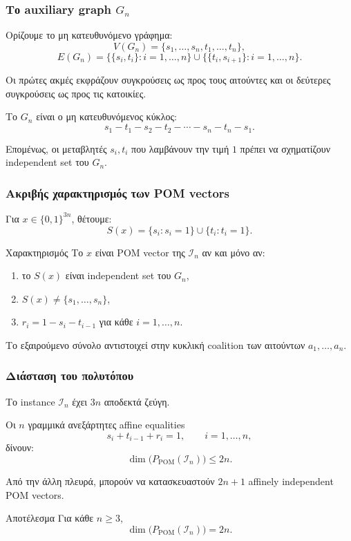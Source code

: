 \documentclass{beamer}
\begin{document}
	\begin{frame}
		\frametitle{Το auxiliary graph $G_n$}
		
		Ορίζουμε το μη κατευθυνόμενο γράφημα:
		\[
		V(G_n)=\{s_1,\ldots,s_n,t_1,\ldots,t_n\},
		\]
		\[
		E(G_n)
		=
		\bigl\{\{s_i,t_i\}:i=1,\ldots,n\bigr\}
		\cup
		\bigl\{\{t_i,s_{i+1}\}:i=1,\ldots,n\bigr\}.
		\]
		
		Οι πρώτες ακμές εκφράζουν συγκρούσεις ως προς τους αιτούντες και οι δεύτερες συγκρούσεις ως προς τις κατοικίες.
		
		Το $G_n$ είναι ο μη κατευθυνόμενος κύκλος:
		\[
		s_1-t_1-s_2-t_2-\cdots-s_n-t_n-s_1.
		\]
		
		Επομένως, οι μεταβλητές $s_i,t_i$ που λαμβάνουν την τιμή $1$ πρέπει να σχηματίζουν independent set του $G_n$.
	\end{frame}
	
	\begin{frame}
		\frametitle{Ακριβής χαρακτηρισμός των POM vectors}
		
		Για $x\in\{0,1\}^{3n}$, θέτουμε:
		\[
		S(x)=\{s_i:s_i=1\}\cup\{t_i:t_i=1\}.
		\]
		
		\begin{block}{Χαρακτηρισμός}
			Το $x$ είναι POM vector της $\mathcal I_n$ αν και μόνο αν:
			
			\begin{enumerate}
				\item το $S(x)$ είναι independent set του $G_n$,
				\item $S(x)\neq\{s_1,\ldots,s_n\}$,
				\item $r_i=1-s_i-t_{i-1}$ για κάθε $i=1,\ldots,n$.
			\end{enumerate}
		\end{block}
		
		Το εξαιρούμενο σύνολο αντιστοιχεί στην κυκλική coalition των αιτούντων $a_1,\ldots,a_n$.
	\end{frame}
	
	\begin{frame}
		\frametitle{Διάσταση του πολυτόπου}
		
		Το instance $\mathcal I_n$ έχει $3n$ αποδεκτά ζεύγη.
		
		Οι $n$ γραμμικά ανεξάρτητες affine equalities
		\[
		s_i+t_{i-1}+r_i=1,
		\qquad i=1,\ldots,n,
		\]
		δίνουν:
		\[
		\dim\bigl(P_{\mathrm{POM}}(\mathcal I_n)\bigr)\leq 2n.
		\]
		
		Από την άλλη πλευρά, μπορούν να κατασκευαστούν $2n+1$ affinely independent POM vectors.
		
		\begin{block}{Αποτέλεσμα}
			Για κάθε $n\geq 3$,
			\[
			\dim\bigl(P_{\mathrm{POM}}(\mathcal I_n)\bigr)=2n.
			\]
		\end{block}
	\end{frame}
	
\end{document}
